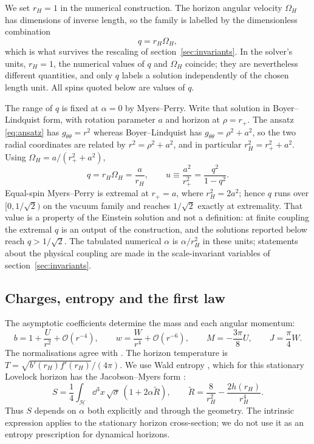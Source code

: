\documentclass[11pt,a4paper]{article}
\begin{document}
We set $r_H=1$ in the numerical construction. The horizon angular velocity
$\Omega_H$ has dimensions of inverse length, so the family is labelled by the
dimensionless combination
\begin{equation}
 q=r_H\Omega_H ,
\end{equation}
which is what survives the rescaling of section~\ref{sec:invariants}.
In the solver's units, $r_H=1$, the numerical values of $q$ and $\Omega_H$
coincide; they are nevertheless different quantities, and only $q$ labels a
solution independently of the chosen length unit. All spins quoted below are
values of $q$.

The range of $q$ is fixed at $\alpha=0$ by Myers--Perry. Write that solution
in Boyer--Lindquist form, with rotation parameter $a$ and horizon at
$\rho=r_+$. The ansatz \eqref{eq:ansatz} has $g_{\theta\theta}=r^2$ whereas
Boyer--Lindquist has $g_{\theta\theta}=\rho^2+a^2$, so the two radial
coordinates are related by $r^2=\rho^2+a^2$, and in particular
$r_H^2=r_+^2+a^2$. Using $\Omega_H=a/(r_+^2+a^2)$,
\begin{equation}
 q=r_H\Omega_H=\frac{a}{r_H},\qquad
 u\equiv\frac{a^2}{r_+^2}=\frac{q^2}{1-q^2}.
 \label{eq:qmp}
\end{equation}
Equal-spin Myers--Perry is extremal at $r_+=a$, where $r_H^2=2a^2$; hence $q$
runs over $[0,1/\sqrt2)$ on the vacuum family and reaches $1/\sqrt2$ exactly
at extremality. That value is a property of the Einstein solution and not a
definition: at finite coupling the extremal $q$ is an output of the
construction, and the solutions reported below reach $q>1/\sqrt2$.
The tabulated numerical $\alpha$ is $\alpha/r_H^2$ in these units; statements
about the physical coupling are made in the scale-invariant variables of
section~\ref{sec:invariants}.

\subsection{Charges, entropy and the first law}

The asymptotic coefficients determine the mass and each angular momentum:
\begin{equation}
 b=1+\frac U{r^2}+\mathcal O(r^{-4}),\qquad
 w=\frac W{r^4}+\mathcal O(r^{-6}),\qquad
 M=-\frac{3\pi}{8}U,\qquad J=\frac\pi4 W.
 \label{eq:charges}
\end{equation}
The normalisations agree with \cite{Brihaye:2010wp}.
The horizon temperature is $T=\sqrt{b'(r_H)f'(r_H)}/(4\pi)$.
We use Wald entropy \cite{Wald:1993nt,Iyer:1994ys}, which for this
stationary Lovelock horizon has the Jacobson--Myers form
\cite{Jacobson:1993xs}:
\begin{equation}
 S=\frac14\int_\mathcal H\dd^3x\,\sqrt\sigma\,
       (1+2\alpha\widetilde R),\qquad
 \widetilde R=\frac8{r_H^2}-\frac{2h(r_H)}{r_H^4}.
 \label{eq:entropy}
\end{equation}
Thus $S$ depends on $\alpha$ both explicitly and through the geometry.
The intrinsic expression applies to the stationary horizon cross-section;
we do not use it as an entropy prescription for dynamical horizons.
\end{document}
